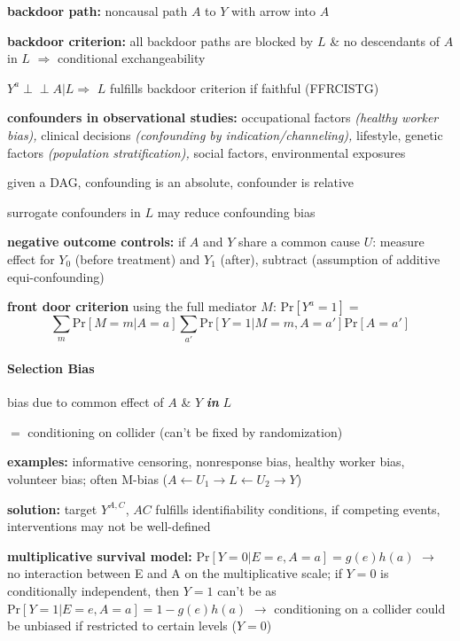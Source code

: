 \documentclass[8pt,twoside]{extarticle}
\newcommand{\indep}{\perp \!\!\! \perp}
\begin{document}
\begin{multicols}{2}
\noindent \textbf{backdoor path:} noncausal path $A$ to $Y$ with arrow into $A$

\noindent \textbf{backdoor criterion:} all backdoor paths are blocked by $L$ \& no descendants of $A$ in $L$ $\Rightarrow$ conditional exchangeability

\noindent $Y^a {\indep} A|L \Rightarrow$ $L$ fulfills backdoor criterion if faithful (FFRCISTG)



\noindent \textbf{confounders in observational studies:} occupational factors \textit{(healthy worker bias),} clinical decisions \textit{(confounding by indication/channeling),} lifestyle, genetic factors \textit{(population stratification),} social factors, environmental exposures

\noindent given a DAG, confounding is an absolute, confounder is relative

\noindent surrogate confounders in $L$ may reduce confounding bias

\noindent \textbf{negative outcome controls:} if $A$ and $Y$ share a common cause $U$: measure effect for $Y_0$ (before treatment) and $Y_1$ (after), subtract (assumption of additive equi-confounding)

\noindent \textbf{front door criterion} using the full mediator $M$: $\mathrm{Pr}\left[Y^a=1\right]=$
$$\sum_m \mathrm{Pr}\left[M=m|A=a\right] \sum_{a'} \mathrm{Pr}\left[Y=1|M=m, A=a'\right]\mathrm{Pr}\left[A=a'\right]$$


\paragraph{Selection Bias} bias due to common effect of $A$ \& $Y$ \textbf{\textit{in}} $L$

 \noindent $=$ conditioning on collider (can't be fixed by randomization)


\noindent \textbf{examples:} informative censoring, nonresponse bias, healthy worker bias, volunteer bias; often M-bias ($A {\leftarrow} U_1 {\to} L {\leftarrow} U_2 {\to} Y$)


\noindent \textbf{solution:} target $Y^{A, C}$, $AC$ fulfills identifiability conditions, \newline
 if competing events, interventions may not be well-defined


\noindent \textbf{multiplicative survival model:} $\mathrm{Pr}\left[Y{=}0|E{=}e, A{=}a\right]{=}g(e)h(a)$
$\rightarrow$ no interaction between E and A on the multiplicative scale; \newline
if $Y=0$ is conditionally independent, then $Y=1$ can't be as $\mathrm{Pr}\left[Y{=}1|E{=}e, A{=}a\right]{=}1-g(e)h(a)$
$\rightarrow$ conditioning on a collider could be unbiased if restricted to certain levels ($Y=0$)



\end{multicols}
\end{document}
